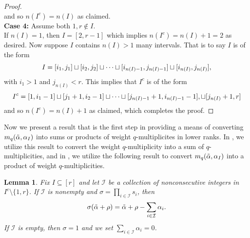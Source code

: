 \documentclass[10pt]{article}
\newtheorem{lemma}[theorem]{Lemma}
\newcommand{\hr}[0]{\Tilde{\alpha}}
\begin{document}
\begin{proof}
\begin{equation}
    \end{equation}
    and so $n(I^c)=n(I)$ as claimed. \\
    \textbf{Case 4:} Assume both $1,r\notin I$.\\
    If $n(I)=1$, then $I=[2,r-1]$ which implies $n(I^c)=n(I)+1=2$ as desired. Now suppose $I$ contains $n(I)>1$ many intervals. That is to say $I$ is of the form
    \begin{equation}
        I = [i_1,j_1]\sqcup [i_2,j_2] \sqcup \cdots \sqcup [i_{n(I)-1},j_{n(I)-1}]\sqcup [i_{n(I)},j_{n(I)}],\notag
    \end{equation}
    with $i_1>1$ and $j_{n(I)}<r$. This implies that $I^c$ is of the form
    \begin{equation}
        I^c = [1,i_1-1] \sqcup [j_1+1,i_2-1] \sqcup \cdots \sqcup [j_{n(I)-1}+1,i_{n(I)-1}-1], \sqcup [j_{n(I)}+1,r]\notag
    \end{equation}
    and so $n(I^c)=n(I)+1$ as claimed, which completes the proof. 
\end{proof}

Now we present a result that is the first step in providing a means of converting $m_q(\hr,\alpha_I)$ into sums 
or products of weight $q$-multiplicites in lower ranks. In , we utilize this result to convert the weight $q$-multiplicity into a sum of $q$-multiplicities, and in , we utilize the following result to convert $m_q(\hr,\alpha_I)$ into a product of weight $q$-multiplicities.
\begin{lemma}\label{lemma: alphas get spit out}
    Fix $I\subseteq[r]$ and let $\mathcal{I}$ be a collection of nonconsecutive integers in $I^c\setminus\{1,r\}$.
    If $\mathcal{I}$ is nonempty and $\sigma=\prod_{i\in \mathcal{I}}s_{i}$, then 
    \begin{equation}
    \sigma(\hr+\rho)=\hr+\rho-\sum_{i\in\mathcal{I}}\alpha_{i}.\notag
    \end{equation}
    If $\mathcal{I}$ is empty, then $\sigma=1$ and we set $\sum_{i\in\mathcal{I}}\alpha_i=0$.
\end{lemma}
\end{document}
